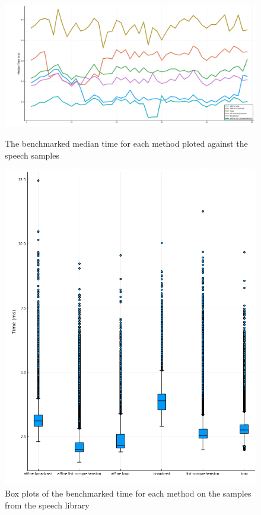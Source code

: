 \documentclass[american,]{article}
\theoremstyle{definition}
\theoremstyle{definition}
\theoremstyle{definition}
\theoremstyle{remark}
\begin{document}
\begin{figure}[H]
    \begin{minipage}{.6\linewidth}
    \centering
    \includegraphics[width=\textwidth]{img/benchmark_median_time.png}
    \caption{The benchmarked median time for each method ploted against the speech samples}
    \label{fig:benchmark_median_time}
    \end{minipage}%
    \hfill
    \begin{minipage}{.35\linewidth}
    \centering
    \includegraphics[width=\textwidth]{img/benchmark_time_boxplot.png}
    \caption{Box plots of the benchmarked time for each method on the samples from the speech library}
    \end{minipage}
\end{figure}
\end{document}
